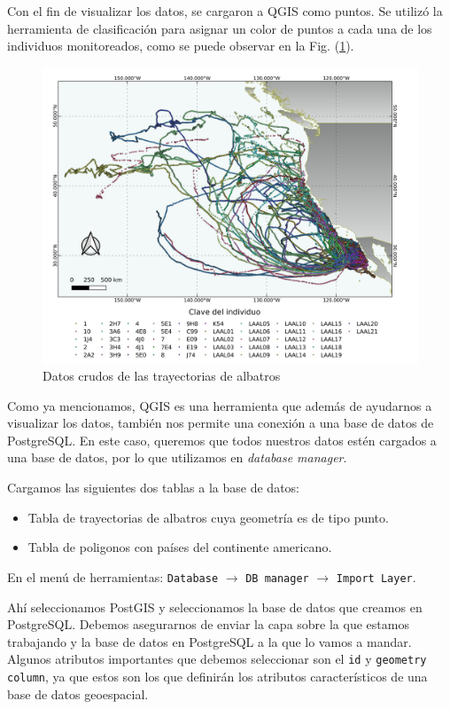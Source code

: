 Con el fin de visualizar los datos, se cargaron a QGIS como puntos. Se utilizó
la herramienta de clasificación para asignar un color de puntos a cada una de
los individuos monitoreados, como se puede observar en la Fig.
(\ref{fig:trayectorias}).

\begin{figure}[h]
    \centering
    \includegraphics[scale=0.60]{figures/RawData.png}
    \caption{Datos crudos de las trayectorias de albatros}
    \label{fig:trayectorias}
\end{figure}

Como ya mencionamos, QGIS es una herramienta que además de ayudarnos a
visualizar los datos, también nos permite una conexión a una base de datos de
PostgreSQL. En este caso, queremos que todos nuestros datos estén
cargados a una base de datos, por lo que utilizamos en \textit{database
manager}.

Cargamos las siguientes dos tablas a la base de datos:

\begin{itemize}
    \item Tabla de trayectorias de albatros cuya geometría es de tipo punto.
    \item Tabla de poligonos con países del continente americano.
\end{itemize}

En el menú de herramientas:
\texttt{Database} $\rightarrow$ \texttt{DB manager} $\rightarrow$ \texttt{Import
Layer}.

Ahí seleccionamos PostGIS y seleccionamos la base de datos que creamos en
PostgreSQL. Debemos asegurarnos de enviar la capa sobre la que estamos
trabajando y la base de datos en PostgreSQL a la que lo vamos a mandar. Algunos
atributos importantes que debemos seleccionar son el \texttt{id} y
\texttt{geometry column}, ya que estos son los que definirán los atributos
característicos de una base de datos geoespacial.

